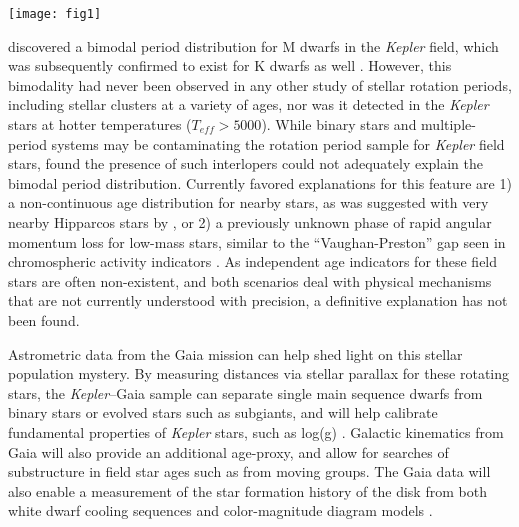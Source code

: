\documentclass[manuscript, letterpaper]{aastex6}
\newcommand{\Kepler}{\textsl{Kepler}\xspace}
\begin{document}
\begin{figure*}[]
\centering
\texttt{[image: fig1]}
\caption{
Rotation period distribution for 33,855 \Kepler stars from \citet{mcquillan2014} with detections in Gaia DR1 (blue dots). The period bimodality can be seen most clearly for stars with $T_{eff} < 4000$ K as a dearth of sources with periods of $\sim$25 days, but extends to at least $T_{eff}\sim5500$ K according to \citet{mcquillan2014}. The subsample of 1,299 nearby objects found in TGAS are highlighted (red circles), and are mostly hotter stars due to the faint limit of the TGAS sample. 
}
\label{fig:all}
\end{figure*}


\citet{mcquillan2013} discovered a bimodal period distribution for M dwarfs in the \Kepler field, which was subsequently confirmed to exist for K dwarfs as well \citep{mcquillan2014}. However, this bimodality had never been observed in any other study of stellar rotation periods, including stellar clusters at a variety of ages, nor was it detected in the \Kepler stars at hotter temperatures ($T_{eff} > 5000$). While binary stars and multiple-period systems may be contaminating the rotation period sample for \Kepler field stars, \citet{mcquillan2014} found the presence of such interlopers could not adequately explain the bimodal period distribution. Currently favored explanations for this feature are 1) a non-continuous age distribution for nearby stars, as was suggested with very nearby Hipparcos stars by \citet{hernandez2000}, or 2) a previously unknown phase of rapid angular momentum loss for low-mass stars, similar to the ``Vaughan-Preston'' gap seen in chromospheric activity indicators \citep{vaughan1980}. As independent age indicators for these field stars are often non-existent, and both scenarios deal with physical mechanisms that are not currently understood with precision, a definitive explanation has not been found.


Astrometric data from the Gaia mission \citep{gaia} can help shed light on this stellar population mystery. By measuring distances via stellar parallax for these rotating stars, the \Kepler--Gaia sample can separate single main sequence dwarfs from binary stars or evolved stars such as subgiants, and will help calibrate fundamental properties of \Kepler stars, such as log(g) \citep{creevey2013}. Galactic kinematics from Gaia will also provide an additional age-proxy, and allow for searches of substructure in field star ages such as from moving groups. The Gaia data will also enable a measurement of the star formation history of the disk from both white dwarf cooling sequences \citep{carrasco2014,gaensicke2015} and color-magnitude diagram models \citep{bertelli1999}.
\end{document}
